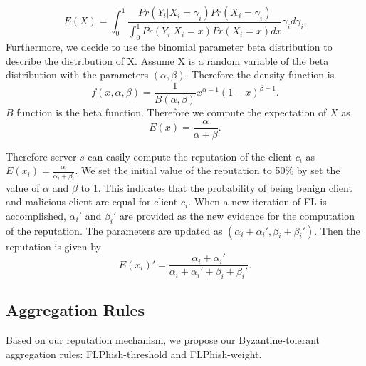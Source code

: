 \documentclass[journal]{IEEEtran}
\begin{document}
\begin{equation}
    E(X)=\int_{0}^{1}\frac{Pr\left ( Y_{i}|X_{i}=\gamma_{i} \right )Pr(X_{i}=\gamma_{i})}{\int_{0}^{1}Pr\left ( Y_{i}|X_{i}=x \right )Pr(X_{i}=x)dx}\gamma_{i}d\gamma_{i}\label{equation_3}.
\end{equation}
Furthermore, we decide to use the binomial parameter beta distribution to describe the distribution of X. Assume X is a random variable of the beta distribution with the parameters $(\alpha, \beta)$. Therefore the density function is
\begin{equation}
    f(x,\alpha,\beta)=\frac{1}{B(\alpha,\beta)}x^{\alpha-1}(1-x)^{\beta-1}\label{equation-4}.
\end{equation}
$B$ function is the beta function. Therefore we compute the expectation of $X$ as
\begin{equation}
    E(x)=\frac{\alpha}{\alpha+\beta}.
\end{equation}

Therefore server ${s}$ can easily compute the reputation of the client ${c_{i}}$ as ${E(x_{i})=\frac{\alpha_{i}}{\alpha_{i}+\beta_{i}}}$. We set the initial value of the reputation to 50\% by set the value of ${\alpha}$ and ${\beta}$ to 1. This indicates that the probability of being benign client and malicious client are equal for client ${c_{i}}$. When a new iteration of FL is accomplished, ${\alpha_{i}}'$ and ${\beta_{i}}'$ are provided as the new evidence for the computation of the reputation. The parameters are updated as ${(\alpha_{i}+{\alpha_{i}}',\beta_{i}+{\beta_{i}}')}$. Then the reputation is given by
\begin{equation}
    {E(x_{i})}'=\frac{\alpha_{i}+{\alpha_{i}}'}{\alpha_{i}+{\alpha_{i}}'+\beta_{i}+{\beta_{i}}'}.
\end{equation}



\subsection{Aggregation Rules}
Based on our reputation mechanism, we propose our Byzantine-tolerant aggregation rules: FLPhish-threshold and FLPhish-weight.
\end{document}
